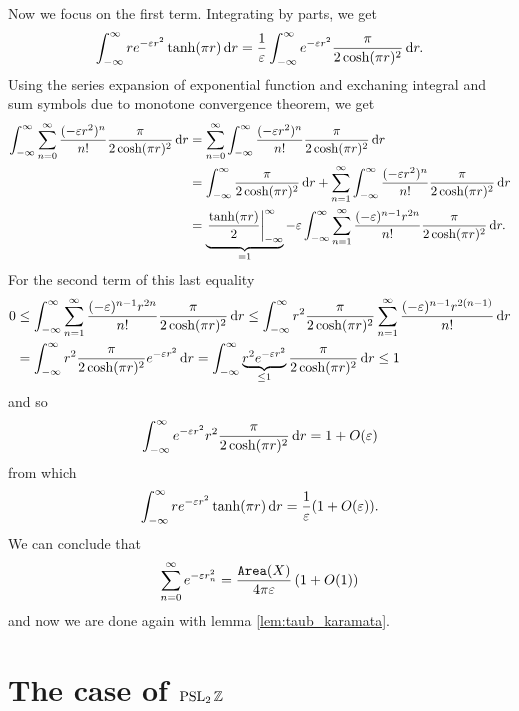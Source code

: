 \begin{prf}
Now we focus on the first term. Integrating by parts, we get 
\[
\int_{-\infty}^{\infty}r e^{-\varepsilon r^{2}}\tanh(\pi r)\mathop{}\!\mathrm{d} r=\frac{1}{\varepsilon}\int_{-\infty}^{\infty}e^{-\varepsilon r^{2}}\frac{\pi}{2\cosh(\pi r)^{2}}\mathop{}\!\mathrm{d} r.
\]
Using the series expansion of exponential function and exchaning integral and sum symbols due to monotone convergence theorem, we get
\begin{align*}
\int_{-\infty}^{\infty}\sum_{n=0}^{\infty}\frac{(-\varepsilon r^{2})^{n}}{n!}\frac{\pi}{2\cosh(\pi r)^{2}}\mathop{}\!\mathrm{d} r&=\sum_{n=0}^{\infty}\int_{-\infty}^{\infty}\frac{(-\varepsilon r^{2})^{n}}{n!}\frac{\pi}{2\cosh(\pi r)^{2}}\mathop{}\!\mathrm{d} r\\
&=\int_{-\infty}^{\infty}\frac{\pi}{2\cosh(\pi r)^{2}}\mathop{}\!\mathrm{d} r+\sum_{n=1}^{\infty}\int_{-\infty}^{\infty}\frac{(-\varepsilon r^{2})^{n}}{n!}\frac{\pi}{2\cosh(\pi r)^{2}}\mathop{}\!\mathrm{d} r\\
&=\underbrace{\left.\frac{\tanh(\pi r)}{2}\right|_{-\infty}^{\infty}}_{=1}-\varepsilon\int_{-\infty}^{\infty}\sum_{n=1}^{\infty}\frac{(-\varepsilon)^{n-1} r^{2n}}{n!}\frac{\pi}{2\cosh(\pi r)^{2}}\mathop{}\!\mathrm{d} r.
\end{align*}
For the second term of this last equality
\begin{align*}
0&\leq \int_{-\infty}^{\infty}\sum_{n=1}^{\infty}\frac{(-\varepsilon)^{n-1} r^{2n}}{n!}\frac{\pi}{2\cosh(\pi r)^{2}}\mathop{}\!\mathrm{d} r\leq \int_{-\infty}^{\infty}r^{2}\frac{\pi}{2\cosh(\pi r)^{2}}\sum_{n=1}^{\infty}\frac{(-\varepsilon)^{n-1} r^{2(n-1)}}{n!}\mathop{}\!\mathrm{d} r\\
& = \int_{-\infty}^{\infty}r^{2}\frac{\pi}{2\cosh(\pi r)^{2}}e^{-\varepsilon r^{2}}\mathop{}\!\mathrm{d} r=\int_{-\infty}^{\infty}\underbrace{r^{2}e^{-\varepsilon r^{2}}}_{\leq 1}\frac{\pi}{2\cosh(\pi r)^{2}}\mathop{}\!\mathrm{d} r \leq 1
\end{align*}
and so 
\[
\int_{-\infty}^{\infty}e^{-\varepsilon r^{2}}r^{2}\frac{\pi}{2\cosh(\pi r)^{2}}\mathop{}\!\mathrm{d} r=1+O(\varepsilon)
\]
from which
\[
\int_{-\infty}^{\infty}r e^{-\varepsilon r^{2}}\tanh(\pi r)\mathop{}\!\mathrm{d} r=\frac{1}{\varepsilon}(1+O(\varepsilon)).
\]
We can conclude that
\[
\sum_{n=0}^{\infty}e^{-\varepsilon r_{n}^{2}}=\frac{\operatorname{\mathtt{Area}}(X)}{4\pi\varepsilon}\left(1+O(1)\right)
\]
and now we are done again with lemma \ref{lem:taub_karamata}.
\end{prf}






\section{The case of $\operatorname{PSL}_{2}\mathbb{Z}$}

